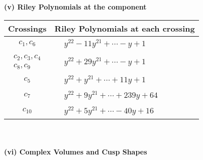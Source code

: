 \documentclass[1p]{elsarticle_modified}
\theoremstyle{definition}
\begin{document}
\flushleft \textbf{(v) Riley Polynomials at the component}\newline \\
\begin{tabular}{m{50pt}|m{274pt}}
Crossings & \hspace{64pt}Riley Polynomials at each crossing \\
\hline $$\begin{aligned}c_{1},c_{6}\end{aligned}$$&$\begin{aligned}
&y^{22}-11 y^{21}+\cdots- y+1
\end{aligned}$\\
\hline $$\begin{aligned}c_{2},c_{3},c_{4}\\c_{8},c_{9}\end{aligned}$$&$\begin{aligned}
&y^{22}+29 y^{21}+\cdots- y+1
\end{aligned}$\\
\hline $$\begin{aligned}c_{5}\end{aligned}$$&$\begin{aligned}
&y^{22}+y^{21}+\cdots+11 y+1
\end{aligned}$\\
\hline $$\begin{aligned}c_{7}\end{aligned}$$&$\begin{aligned}
&y^{22}+9 y^{21}+\cdots+239 y+64
\end{aligned}$\\
\hline $$\begin{aligned}c_{10}\end{aligned}$$&$\begin{aligned}
&y^{22}+5 y^{21}+\cdots-40 y+16
\end{aligned}$\\
\hline
\end{tabular}\\~\\
\newpage\flushleft \textbf{(vi) Complex Volumes and Cusp Shapes}
\end{document}

